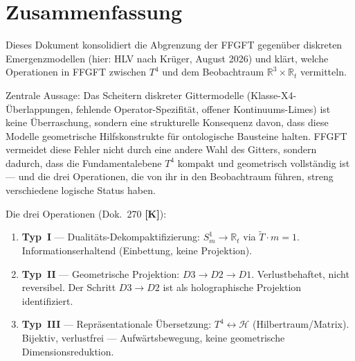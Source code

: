 
\providecommand{\K}{}\renewcommand{\K}{\textbf{[K]}}
\providecommand{\B}{}\renewcommand{\B}{\textbf{[B]}}
\renewcommand{\S}{\textbf{[S]}}
\providecommand{\SETZ}{}\renewcommand{\SETZ}{\textbf{[SETZUNG]}}
\providecommand{\E}{}\renewcommand{\E}{\textbf{[E]}}
\providecommand{\lP}{}\renewcommand{\lP}{\ell_{\mathrm{P}}}
\providecommand{\Tmass}{}\renewcommand{\Tmass}{\tilde{T}}


\section*{Zusammenfassung}

Dieses Dokument konsolidiert die Abgrenzung der FFGFT gegenüber
diskreten Emergenzmodellen (hier: HLV nach Krüger, August 2026)
und klärt, welche Operationen in FFGFT zwischen $T^4$ und dem
Beobachtraum $\mathbb{R}^3 \times \mathbb{R}_t$ vermitteln.

Zentrale Aussage: Das Scheitern diskreter Gittermodelle (Klasse-X4-
Überlappungen, fehlende Operator-Spezifität, offener Kontinuums-Limes)
ist keine Überraschung, sondern eine strukturelle Konsequenz davon,
dass diese Modelle geometrische Hilfskonstrukte für ontologische
Bausteine halten. FFGFT vermeidet diese Fehler nicht durch eine
andere Wahl des Gitters, sondern dadurch, dass die Fundamentalebene
$T^4$ kompakt und geometrisch vollständig ist — und die drei Operationen,
die von ihr in den Beobachtraum führen, streng verschiedene logische
Status haben.

Die drei Operationen (Dok.~270 \K):
\begin{enumerate}
  \item \textbf{Typ~I} — Dualitäts-Dekompaktifizierung:
    $S^1_m \to \mathbb{R}_t$ via $\Tmass\cdot m = 1$.
    Informationserhaltend (Einbettung, keine Projektion).
  \item \textbf{Typ~II} — Geometrische Projektion:
    $D3 \to D2 \to D1$. Verlustbehaftet, nicht reversibel.
    Der Schritt $D3 \to D2$ ist als holographische Projektion
    identifiziert.
  \item \textbf{Typ~III} — Repräsentationale Übersetzung:
    $T^4 \leftrightarrow \mathcal{H}$ (Hilbertraum/Matrix).
    Bijektiv, verlustfrei — Aufwärtsbewegung, keine geometrische
    Dimensionsreduktion.
\end{enumerate}

